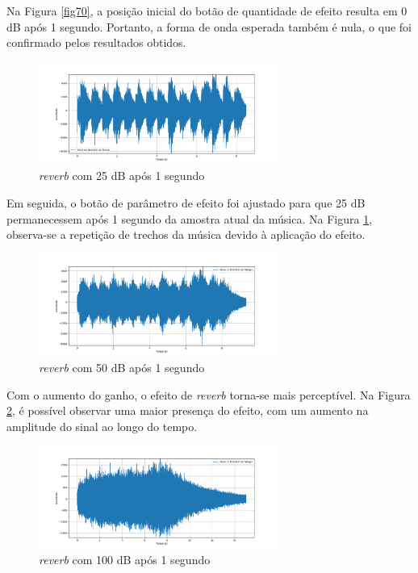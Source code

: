 Na Figura \ref{fig70}, a posição inicial do botão de quantidade de efeito resulta em 0 dB após 1 segundo. Portanto, a forma de onda esperada também é nula, o que foi confirmado pelos resultados obtidos.

\begin{figure}[h]
    \centering
    \includegraphics[width=0.7\textwidth]{figuras/fig71.png}
    \caption{\textit{reverb} com 25 dB após 1 segundo}
    \label{fig71}
\end{figure}

Em seguida, o botão de parâmetro de efeito foi ajustado para que 25 dB permanecessem após 1 segundo da amostra atual da música. Na Figura \ref{fig71}, observa-se a repetição de trechos da música devido à aplicação do efeito.


\newpage
\begin{figure}[h]
    \centering
    \includegraphics[width=0.7\textwidth]{figuras/fig72.png}
    \caption{\textit{reverb} com 50 dB após 1 segundo}
    \label{fig72}
\end{figure}

Com o aumento do ganho, o efeito de \textit{reverb} torna-se mais perceptível. Na Figura \ref{fig72}, é possível observar uma maior presença do efeito, com um aumento na amplitude do sinal ao longo do tempo.

\begin{figure}[h]
    \centering
    \includegraphics[width=0.7\textwidth]{figuras/fig73.png}
    \caption{\textit{reverb} com 100 dB após 1 segundo}
    \label{fig73}
\end{figure}

